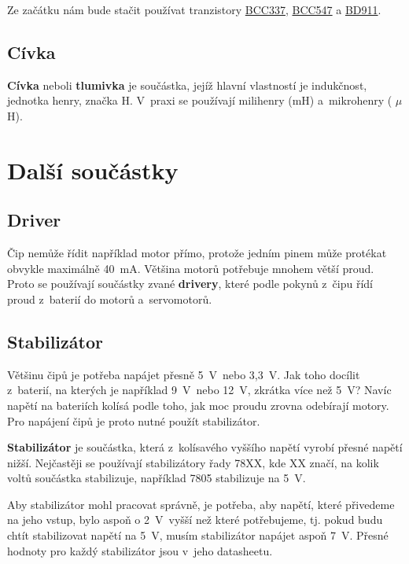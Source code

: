 Ze začátku nám bude stačit používat tranzistory 
\hyperlink{BCC337}{BCC337}, 
\hyperlink{BCC547}{BCC547} a
\hyperlink{BD911}{BD911}. 


\subsection{Cívka}

{\bf Cívka} neboli {\bf tlumivka} je součástka, 
jejíž hlavní vlastností je indukčnost, jednotka henry, značka H.
 V~praxi se používají milihenry (mH) a~mikrohenry ( $\mu$H).

\section{Další součástky}

\subsection{Driver}

\hypertarget{drivery}{} 
Čip nemůže řídit například motor přímo, protože jedním pinem může protékat obvykle maximálně 40~mA. 
Většina motorů potřebuje mnohem větší proud.
 Proto se používají součástky zvané {\bf drivery}, které podle pokynů z~čipu řídí proud z~baterií do motorů a~servomotorů. 

\subsection{Stabilizátor}

Většinu čipů je potřeba napájet přesně 5~V~nebo 3,3~V. Jak toho docílit z~baterií, na kterých je například 9~V~nebo 12~V, zkrátka více než 5~V? 
Navíc napětí na bateriích kolísá podle toho, jak moc proudu zrovna odebírají motory. 
Pro napájení čipů je proto nutné použít stabilizátor. 

{\bf Stabilizátor} je součástka, která z~kolísavého vyššího napětí vyrobí přesné napětí nižší. %
Nejčastěji se používají stabilizátory řady 78XX, kde XX značí, na kolik voltů součástka stabilizuje, například 7805 stabilizuje na 5~V. 

Aby stabilizátor mohl pracovat správně, je potřeba, aby napětí, které přivedeme na jeho vstup,
 bylo aspoň o 2~V~vyšší než které potřebujeme, tj. pokud budu chtít stabilizovat napětí na 5~V, 
 musím stabilizátor napájet aspoň 7~V. Přesné hodnoty pro každý stabilizátor jsou v~jeho datasheetu. 


